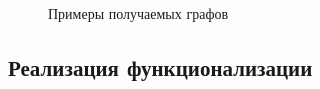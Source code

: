 \documentclass[14pt]{extarticle}
\begin{document}
  \begin{figure}[h]
	\begin{minipage}[h]{0.49\linewidth}
	\end{minipage}
	\hfill
	\begin{minipage}[h]{0.49\linewidth}
	\end{minipage}
	\caption{Примеры получаемых графов}
  \end{figure}

\newpage
\subsection{Реализация функционализации}
\end{document}
